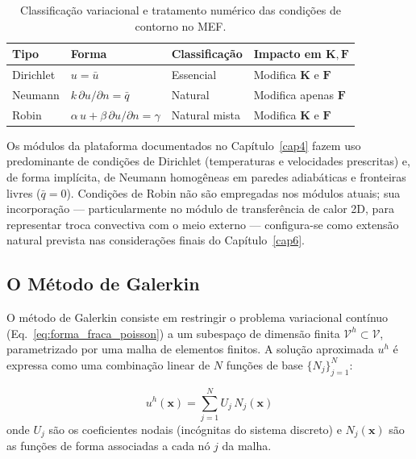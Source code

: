 \begin{table}[H]
\centering
\caption{Classificação variacional e tratamento numérico das condições de contorno no MEF.}
\label{tab:cc_resumo}
\begin{tabular}{llll}
\hline
\textbf{Tipo} & \textbf{Forma} & \textbf{Classificação} & \textbf{Impacto em $\mathbf{K},\mathbf{F}$} \\
\hline
Dirichlet & $u = \bar{u}$                                      & Essencial    & Modifica $\mathbf{K}$ e $\mathbf{F}$ \\
Neumann   & $k\,\partial u/\partial n = \bar{q}$               & Natural      & Modifica apenas $\mathbf{F}$ \\
Robin     & $\alpha\,u + \beta\,\partial u/\partial n = \gamma$ & Natural mista & Modifica $\mathbf{K}$ e $\mathbf{F}$ \\
\hline
\end{tabular}
\end{table}

Os módulos da plataforma documentados no Capítulo~\ref{cap4} fazem uso predominante de condições de Dirichlet (temperaturas e velocidades prescritas) e, de forma implícita, de Neumann homogêneas em paredes adiabáticas e fronteiras livres ($\bar{q} = 0$). Condições de Robin não são empregadas nos módulos atuais; sua incorporação --- particularmente no módulo de transferência de calor 2D, para representar troca convectiva com o meio externo --- configura-se como extensão natural prevista nas considerações finais do Capítulo~\ref{cap6}.

\subsection{O Método de Galerkin}
\label{sec:galerkin}

O método de Galerkin consiste em restringir o problema variacional contínuo (Eq.~\ref{eq:forma_fraca_poisson}) a um subespaço de dimensão finita $\mathcal{V}^h \subset \mathcal{V}$, parametrizado por uma malha de elementos finitos. A solução aproximada $u^h$ é expressa como uma combinação linear de $N$ funções de base $\{N_j\}_{j=1}^{N}$:

\begin{equation}
u^h(\mathbf{x}) = \sum_{j=1}^{N} U_j \, N_j(\mathbf{x})
\label{eq:aproximacao_galerkin}
\end{equation}
onde $U_j$ são os coeficientes nodais (incógnitas do sistema discreto) e $N_j(\mathbf{x})$ são as funções de forma associadas a cada nó $j$ da malha.

